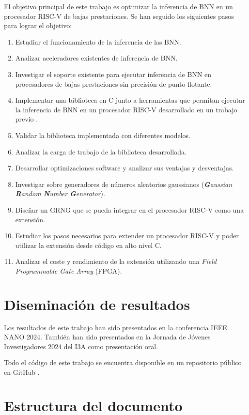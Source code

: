 El objetivo principal de este trabajo es optimizar la inferencia de BNN en un procesador RISC-V de bajas prestaciones. Se han seguido los siguientes pasos para lograr el objetivo:
\begin{enumerate}
	\item Estudiar el funcionamiento de la inferencia de las BNN.
	\item Analizar aceleradores existentes de inferencia de BNN.
	\item Investigar el soporte existente para ejecutar inferencia de BNN en procesadores de bajas prestaciones sin precisión de punto flotante.
	\item Implementar una biblioteca en C junto a herramientas que permitan ejecutar la inferencia de BNN en un procesador RISC-V desarrollado en un trabajo previo \cite{riscv_tfg}.
	\item Validar la biblioteca implementada con diferentes modelos.
	\item Analizar la carga de trabajo de la biblioteca desarrollada.
	\item Desarrollar optimizaciones software y analizar sus ventajas y desventajas.
	\item Investigar sobre generadores de números aleatorios gaussianos (\textit{\textbf{G}aussian \textbf{R}andom \textbf{N}umber \textbf{G}enerator}).
	\item Diseñar un GRNG que se pueda integrar en el procesador RISC-V como una extensión.
	\item Estudiar los pasos necesarios para extender un procesador RISC-V y poder utilizar la extensión desde código en alto nivel C.
	\item Analizar el coste y rendimiento de la extensión utilizando una \textit{Field Programmable Gate Array} (FPGA).
\end{enumerate}

\section{Diseminación de resultados}

Los resultados de este trabajo han sido presentados en la conferencia IEEE NANO 2024. También han sido presentados en la Jornada de Jóvenes Investigadores 2024 del I3A como presentación oral.

Todo el código de este trabajo se encuentra disponible en un repositorio público en GitHub \cite{bnn_github}.

\section{Estructura del documento}

